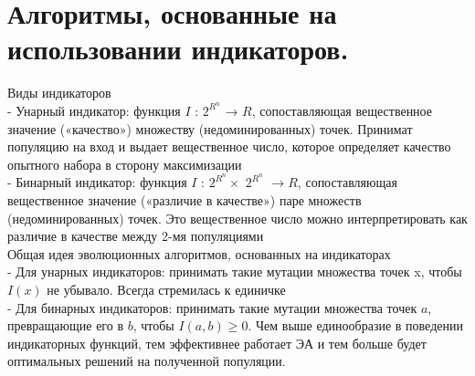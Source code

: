 \section{Алгоритмы, основанные на использовании индикаторов.}
Виды индикаторов\\
- Унарный индикатор: функция $I$ : $2^{R^n}$ → $R$, сопоставляющая вещественное
значение («качество») множеству (недоминированных) точек.
Принимат популяцию на вход и выдает вещественное число, которое определяет качество опытного набора в сторону максимизации\\
- Бинарный индикатор: функция $I$ : $2^{R^n} ×$ $ 2^{R^n} $ $→R$, сопоставляющая
вещественное значение («различие в качестве») паре множеств
(недоминированных) точек. Это вещественное число можно интерпретировать как различие в качестве между 2-мя популяциями\\

Общая идея эволюционных алгоритмов, основанных на индикаторах\\
- Для унарных индикаторов: принимать такие мутации множества точек x,
чтобы $I(x)$ не убывало. Всегда стремилась к единичке\\
- Для бинарных индикаторов: принимать такие мутации множества точек $a$,
превращающие его в $b$, чтобы $I(a,b) \geq 0$. Чем выше единообразие в поведении индикаторных функций, тем эффективнее работает ЭА и тем больше будет оптимальных решений на полученной популяции.
